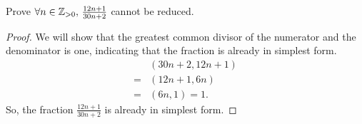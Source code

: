 \documentclass[../hw1]{subfiles}
\begin{document}
\begin{problem}[5]
Prove $\forall n \in \mathbb{Z}_{>0},\, \frac{12n+1}{30n+2}$ cannot be reduced.
\end{problem}
\begin{proof}
	We will show that the greatest common divisor of the numerator and the denominator is one, indicating that the fraction is already in simplest form.
	\begin{align*}
		  & (30n+2,12n+1) \\
		= & (12n+1,6n)    \\
		= & (6n,1) = 1
		.\end{align*}
	So, the fraction $\frac{12n+1}{30n+2}$ is already in simplest form.
\end{proof}
\end{document}
